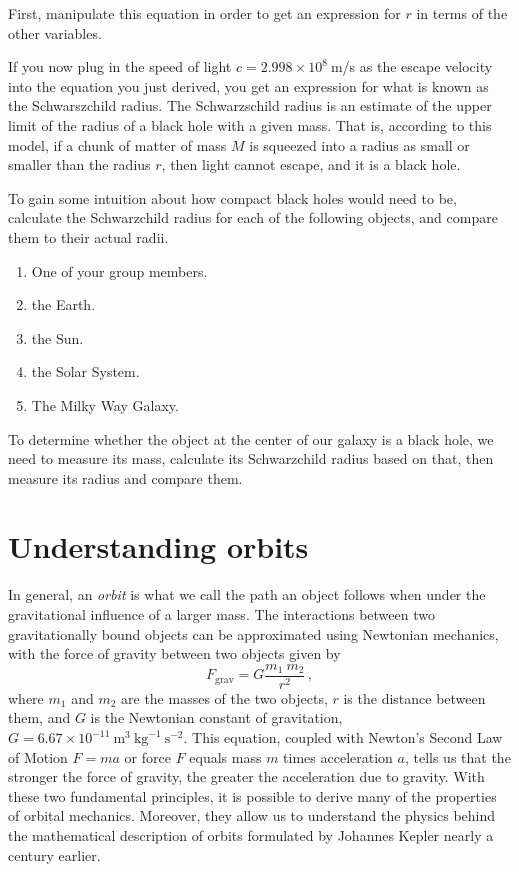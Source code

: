 \begin{steps}
	\item  First, manipulate this equation in order to get an expression for $r$ in terms of the other variables.
\end{steps}
If you now plug in the speed of light $c = 2.998 \times 10^{8}\:$m/s as the escape velocity into the equation you just derived, you get an expression for what is known as the Schwarszchild radius. The Schwarzschild radius is an estimate of the upper limit of the radius of a black hole with a given mass. That is, according to this model, if a chunk of matter of mass $M$ is squeezed into a radius as small or smaller than the radius $r$, then light cannot escape, and it is a black hole.

\begin{steps}
	\item To gain some intuition about how compact black holes would need to be, calculate the Schwarzchild radius for each of the following objects, and compare them to their actual radii.
	\begin{enumerate}
		\item One of your group members.
		\item the Earth.
		\item the Sun.
		\item the Solar System.
		\item The Milky Way Galaxy.
	\end{enumerate}
\end{steps}

To determine whether the object at the center of our galaxy is a black hole, we need to measure its mass, calculate its Schwarzchild radius based on that, then measure its radius and compare them.

\section{Understanding orbits}


In general, an \textit{orbit} is what we call the path an object follows when under the gravitational influence of a larger mass. The interactions between two gravitationally bound objects can be approximated using Newtonian mechanics, with the force of gravity between two objects given by 
\begin{equation}\label{gc:eq:newton}
F_\textrm{grav} = G \frac{m_1 \: m_2}{r^2} \, ,
\end{equation}
where $m_1$ and $m_2$ are the masses of the two objects, $r$ is the distance between them, and $G$ is the Newtonian constant of gravitation, $G=6.67 \times 10^{-11}\:\textrm{m}^3 \: \textrm{kg}^{-1} \: \textrm{s}^{-2}$. This equation, coupled with Newton's Second Law of Motion $F = ma$ or force $F$ equals mass $m$ times acceleration $a$, tells us that the stronger the force of gravity, the greater the acceleration due to gravity. With these two fundamental principles, it is possible to derive many of the properties of orbital mechanics. Moreover, they allow us to understand the physics behind the mathematical description of orbits formulated by Johannes Kepler nearly a century earlier.

